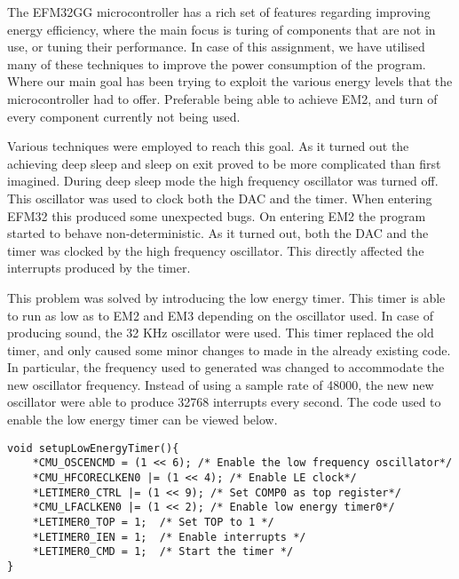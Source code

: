 The EFM32GG microcontroller has a rich set of features regarding improving energy efficiency, where the main focus is turing of components that are not in use, or tuning their performance. In case of this assignment, we have utilised many of these techniques to improve the power consumption of the program. Where our main goal has been trying to exploit the various energy levels that the microcontroller had to offer. Preferable being able to achieve EM2, and turn of every component currently not being used. 

Various techniques were employed to reach this goal. As it turned out the achieving deep sleep and sleep on exit proved to be more complicated than first imagined. During deep sleep mode the high frequency oscillator was turned off. This oscillator was used to clock both the DAC and the timer. When entering EFM32 this produced some unexpected bugs. On entering EM2 the program started to behave non-deterministic. As it turned out, both the DAC and the timer was clocked by the high frequency oscillator. This directly affected the interrupts produced by the timer.

This problem was solved by introducing the low energy timer. This timer is able to run as low as to EM2 and EM3 depending on the oscillator used. In case of producing sound, the 32 KHz oscillator were used. This timer replaced the old timer, and only caused some minor changes to made in the already existing code. In particular, the frequency used to generated was changed to accommodate the new oscillator frequency. Instead of  using a sample rate of 48000, the new 
new oscillator were able to produce 32768 interrupts every second. The code used to enable the low energy timer can be viewed below.  


\begin{lstlisting}
void setupLowEnergyTimer(){
    *CMU_OSCENCMD = (1 << 6); /* Enable the low frequency oscillator*/
    *CMU_HFCORECLKEN0 |= (1 << 4); /* Enable LE clock*/
    *LETIMER0_CTRL |= (1 << 9); /* Set COMP0 as top register*/
    *CMU_LFACLKEN0 |= (1 << 2); /* Enable low energy timer0*/
    *LETIMER0_TOP = 1;  /* Set TOP to 1 */
    *LETIMER0_IEN = 1;  /* Enable interrupts */ 
    *LETIMER0_CMD = 1;  /* Start the timer */
}

\end{lstlisting}


